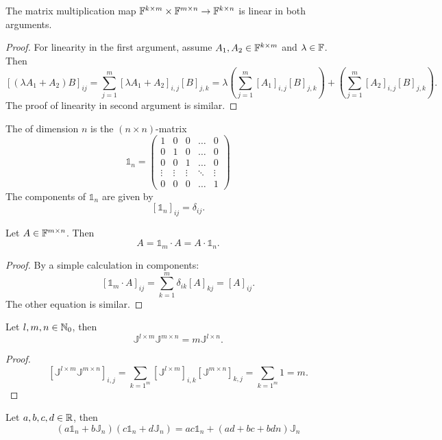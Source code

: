 \begin{lemma} \label{lemma:linearityMatrixMultiplication}
The matrix multiplication map $\mathbb{F}^{k\times m}\times \mathbb{F}^{m\times n} \to \mathbb{F}^{k\times n}$ is linear in both arguments.
\end{lemma}
\begin{proof}
For linearity in the first argument, assume $A_1,A_2\in\mathbb{F}^{k\times m}$ and $\lambda\in \mathbb{F}$. Then
\[ [(\lambda A_1+ A_2)B]_{ij} = \sum_{j=1}^m[\lambda A_1+ A_2]_{i,j}[B]_{j,k} = \lambda \left(\sum_{j=1}^m[A_1]_{i,j}[B]_{j,k}\right) + \left(\sum_{j=1}^m[A_2]_{i,j}[B]_{j,k}\right). \]
The proof of linearity in second argument is similar.
\end{proof}

\begin{definition}
The  of dimension $n$ is the $(n\times n)$-matrix
\[ \mathbb{1}_n = \begin{pmatrix}
1 & 0 & 0 & \hdots & 0\\
0 & 1 & 0 & \hdots & 0\\
0 & 0 & 1 & \hdots & 0\\
\vdots & \vdots & \vdots & \ddots & \vdots \\
0 & 0 & 0 & \hdots & 1
\end{pmatrix} \]
The components of $\mathbb{1}_n$ are given by
\[ [\mathbb{1}_n]_{ij} = \delta_{ij}. \]
\end{definition}

\begin{lemma}
Let $A\in\mathbb{F}^{m\times n}$. Then
\[ A = \mathbb{1}_m\cdot A = A \cdot \mathbb{1}_n. \]
\end{lemma}
\begin{proof}
By a simple calculation in components:
\[ [\mathbb{1}_m\cdot A]_{ij} = \sum_{k=1}^m\delta_{ik}[A]_{kj} = [A]_{ij}. \]
The other equation is similar.
\end{proof}

\begin{lemma} \label{lemma:matrixOfOnesMultiplication}
Let $l,m,n\in\mathbb{N}_0$, then
\[ \mathbb{J}^{l\times m}\mathbb{J}^{m\times n} = m\mathbb{J}^{l\times n}. \]
\end{lemma}
\begin{proof}
\[ [\mathbb{J}^{l\times m}\mathbb{J}^{m\times n}]_{i,j} = \sum_{k=1^m}[\mathbb{J}^{l\times m}]_{i,k}[\mathbb{J}^{m\times n}]_{k,j} = \sum_{k=1^m}1 = m. \]
\end{proof}
\begin{corollary}
Let $a,b,c,d\in\mathbb{R}$, then
\[ (a\mathbb{1}_n + b\mathbb{J}_n)(c\mathbb{1}_n + d\mathbb{J}_n) = ac\mathbb{1}_n + (ad+bc +bdn)\mathbb{J}_n \]
\end{corollary}

